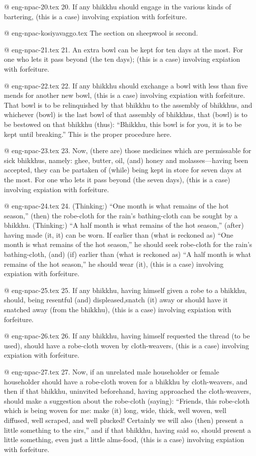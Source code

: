 @ eng-npac-20.tex
20. If any bhikkhu should engage in the various kinds of bartering, (this is a case) involving expiation with forfeiture.

@ eng-npac-kosiyavaggo.tex
The section on sheepwool is second.

@ eng-npac-21.tex
21. An extra bowl can be kept for ten days at the most. For one who lets it pass beyond (the ten days); (this is a case) involving expiation with forfeiture.

@ eng-npac-22.tex
22. If any bhikkhu should exchange a bowl with less than five mends for another new bowl, (this is a case) involving expiation with forfeiture. That bowl is to be relinquished by that bhikkhu to the assembly of bhikkhus, and whichever (bowl) is the last bowl of that assembly of bhikkhus, that (bowl) is to be bestowed on that bhikkhu (thus): “Bhikkhu, this bowl is for you, it is to be kept until breaking.” This is the proper procedure here.

@ eng-npac-23.tex
23. Now, (there are) those medicines which are permissable for sick bhikkhus, namely: ghee, butter, oil, (and) honey and molasses—having been accepted, they can be partaken of (while) being kept in store for seven days at the most. For one who lets it pass beyond (the seven days), (this is a case) involving expiation with forfeiture.

@ eng-npac-24.tex
24. (Thinking:) “One month is what remains of the hot season,” (then) the robe-cloth for the rain's bathing-cloth can be sought by a bhikkhu. (Thinking:) “A half month is what remains of the hot season,” (after) having made (it, it) can be worn. If earlier than (what is reckoned as) “One month is what remains of the hot season,” he should seek robe-cloth for the rain's bathing-cloth, (and) (if) earlier than (what is reckoned as) “A half month is what remains of the hot season,” he should wear (it), (this is a case) involving expiation with forfeiture.

@ eng-npac-25.tex
25. If any bhikkhu, having himself given a robe to a bhikkhu, should, being resentful (and) displeased,snatch (it) away or should have it snatched away (from the bhikkhu), (this is a case) involving expiation with forfeiture.

@ eng-npac-26.tex
26. If any bhikkhu, having himself requested the thread (to be used), should have a robe-cloth woven by cloth-weavers, (this is a case) involving expiation with forfeiture.

@ eng-npac-27.tex
27. Now, if an unrelated male householder or female householder should have a robe-cloth woven for a bhikkhu by cloth-weavers, and then if that bhikkhu, uninvited beforehand, having approached the cloth-weavers, should make a suggestion about the robe-cloth (saying): “Friends, this robe-cloth which is being woven for me: make (it) long, wide, thick, well woven, well diffused, well scraped, and well plucked! Certainly we will also (then) present a little something to the sirs,” and if that bhikkhu, having said so, should present a little something, even just a little alms-food, (this is a case) involving expiation with forfeiture.

